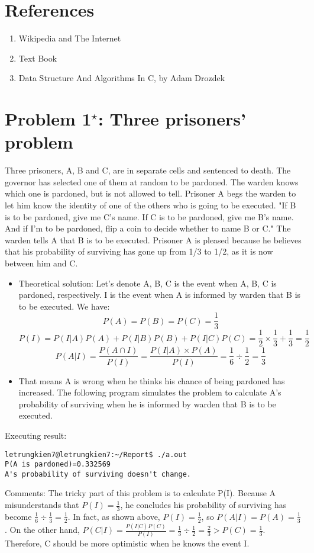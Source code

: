 \documentclass[11pt]{article}
\begin{document}
\section*{References}
\begin{enumerate}
\item Wikipedia and The Internet
\item Text Book
\item Data Structure And Algorithms In C, by Adam Drozdek
\end{enumerate}
\newpage
{}
\setcounter{page}{1}
\section{Problem 1${}^{\star}$: \normalsize Three prisoners' problem}
\indent Three prisoners, A, B and C, are in separate cells and sentenced to death. The governor has selected one of them at random to be pardoned. The warden knows which one is pardoned, but is not allowed to tell. Prisoner A begs the warden to let him know the identity of one of the others who is going to be executed. "If B is to be pardoned, give me C's name. If C is to be pardoned, give me B's name. And if I'm to be pardoned, flip a coin to decide whether to name B or C." The warden tells A that B is to be executed. Prisoner A is pleased because he believes that his probability of surviving has gone up from 1/3 to 1/2, as it is now between him and C. \\
\begin{itemize}
\item Theoretical solution: Let's denote A, B, C is the event when A, B, C is pardoned, respectively. I is the event when A is informed by warden that B is to be executed. We have:
\[P(A)=P(B)=P(C)=\frac{1}{3}\]
\[P(I)=P(I|A)P(A)+P(I|B)P(B)+P(I|C)P(C)=\frac{1}{2}\times\frac{1}{3}+\frac{1}{3}=\frac{1}{2}\]
\[P(A|I)=\frac{P(A \cap I)}{P(I)}=\frac{P(I|A)\times P(A)}{P(I)}=\frac{1}{6}\div \frac{1}{2}=\frac{1}{3}\]
\item That means A is wrong when he thinks his chance of being pardoned has increased. The following program simulates the problem to calculate A's probability of surviving when he is informed by warden that B is to be executed.
\end{itemize}
Executing result:
%
\begin{verbatim}
letrungkien7@letrungkien7:~/Report$ ./a.out
P(A is pardoned)=0.332569
A's probability of surviving doesn't change.
\end{verbatim}
Comments: The tricky part of this problem is to calculate P(I). Because A misunderstands that $P(I)=\frac{1}{3}$, he concludes his probability of surviving has become $\frac{1}{6}\div \frac{1}{3}=\frac{1}{2}$. In fact, as shown above, $P(I)=\frac{1}{2}$, so $P(A|I)=P(A)=\frac{1}{3}$. On the other hand, $P(C|I)=\frac{P(I|C)P(C)}{P(I)}=\frac{1}{3}\div \frac{1}{2}=\frac{2}{3}>P(C)=\frac{1}{3}$. Therefore, C should be more optimistic when he knows the event I.
\newpage
\end{document}
